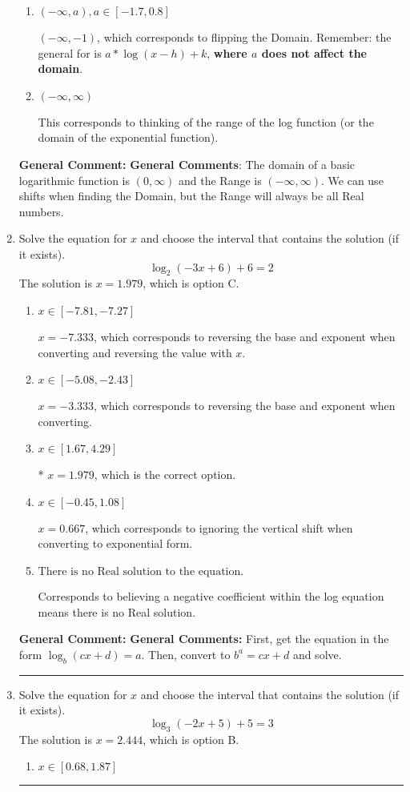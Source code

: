 \documentclass{extbook}[14pt]
\newcommand{\litem}[1]{\item #1

\rule{\textwidth}{0.4pt}}
\begin{document}
\begin{enumerate}
{\begin{enumerate}[label=\Alph*.]
$(-\infty, -6]$, which corresponds to using the negative vertical shift AND including the endpoint AND flipping the domain.
\item \( (-\infty, a), a \in [-1.7, 0.8] \)

$(-\infty, -1)$, which corresponds to flipping the Domain. Remember: the general for is $a*\log(x-h)+k$, \textbf{where $a$ does not affect the domain}.
\item \( (-\infty, \infty) \)

This corresponds to thinking of the range of the log function (or the domain of the exponential function).
\end{enumerate}

\textbf{General Comment:} \textbf{General Comments}: The domain of a basic logarithmic function is $(0, \infty)$ and the Range is $(-\infty, \infty)$. We can use shifts when finding the Domain, but the Range will always be all Real numbers.
}
\litem{
Solve the equation for $x$ and choose the interval that contains the solution (if it exists).
\[ \log_{2}{(-3x+6)}+6 = 2 \]
The solution is \( x = 1.979 \), which is option C.\begin{enumerate}[label=\Alph*.]
\item \( x \in [-7.81, -7.27] \)

$x = -7.333$, which corresponds to reversing the base and exponent when converting and reversing the value with $x$.
\item \( x \in [-5.08, -2.43] \)

$x = -3.333$, which corresponds to reversing the base and exponent when converting.
\item \( x \in [1.67, 4.29] \)

* $x = 1.979$, which is the correct option.
\item \( x \in [-0.45, 1.08] \)

$x = 0.667$, which corresponds to ignoring the vertical shift when converting to exponential form.
\item \( \text{There is no Real solution to the equation.} \)

Corresponds to believing a negative coefficient within the log equation means there is no Real solution.
\end{enumerate}

\textbf{General Comment:} \textbf{General Comments:} First, get the equation in the form $\log_b{(cx+d)} = a$. Then, convert to $b^a = cx+d$ and solve.
}
\litem{
Solve the equation for $x$ and choose the interval that contains the solution (if it exists).
\[ \log_{3}{(-2x+5)}+5 = 3 \]
The solution is \( x = 2.444 \), which is option B.\begin{enumerate}[label=\Alph*.]
\item \( x \in [0.68, 1.87] \)


\end{enumerate}}
\end{enumerate}
\end{document}
